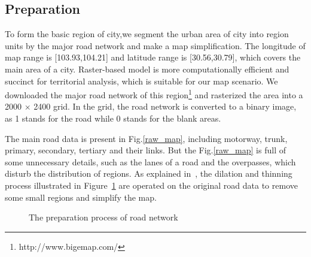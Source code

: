 \documentclass[runningheads]{llncs}
\begin{document}
\subsection{Preparation}
To form the basic region of city,we segment the urban area of city into region units by the major road network and make a map simplification.
The longitude of map range is [103.93,104.21] and latitude range is [30.56,30.79], which covers the main area of a city.
Raster-based model is more computationally efficient and succinct for territorial analysis, which is suitable for our map scenario.
We downloaded the major road network of this region\footnote{http://www.bigemap.com/} and rasterized the area into a 2000 $\times$ 2400 grid.
In the grid, the road network is converted to a binary image, as 1 stands for the road while 0 stands for the blank areas.

The main road data is present in Fig.\ref{raw_map}, including motorway, trunk, primary, secondary, tertiary and their links.
But the Fig.\ref{raw_map} is full of some unnecessary details, such as the lanes of a road and the overpasses, which disturb the distribution of regions.
As explained in~\cite{Yuan2015FunctionRegion}, the dilation and thinning process illustrated in Figure~\ref{dilation and thinning} are operated on the original road data to remove some small regions and simplify the map.
\begin{figure}[h]
    \centering
    \caption{The preparation process of road network}
    \label{dilation and thinning} %
\end{figure}
\end{document}
